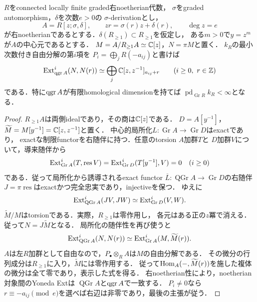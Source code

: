 \documentclass[11pt,a4paper]{ltjsarticle}
\begin{document}
\begin{lemma}[中心的な局所化を持つOre拡大の頂点]
\label{lem:v6-ore-differential-vertex}
$R$をconnected locally finite graded右noetherian代数，
$\sigma$をgraded automorphism，$\delta$を次数$e>0$の
$\sigma$-derivationとし，
\[
 A=R[z;\sigma,\delta],\qquad zr=\sigma(r)z+\delta(r),
 \qquad \deg z=e
\]
が右noetherianであるとする．$\delta(R_{\geq1})\subset R_{\geq1}$を仮定し，
ある$m>0$で$y=z^m$が$A$の中心元であるとする．
$M=A/R_{\geq1}A\simeq\mathbb C[z]$，$N=\pi M$と置く．
$k_R$の最小次数付き自由分解の第$i$項を
$P_i=\bigoplus_j R(-a_{ij})$と書けば
\[
 \operatorname{Ext}^i_{\operatorname{qgr} A}(N,N(r))
 \simeq\bigoplus_j\mathbb C[z,z^{-1}]_{a_{ij}+r}
 \qquad(i\geq0,\ r\in\mathbb Z)
\]
である．特に$\operatorname{qgr} A$が有限homological dimensionを持てば
$\operatorname{pd}_{\operatorname{Gr}R}k_R<\infty$となる．
\end{lemma}
\begin{proof}
$R_{\geq1}A$は両側idealであり，その商は$\mathbb C[z]$である．
$D=A[y^{-1}]$，$\widetilde M=M[y^{-1}]=\mathbb C[z,z^{-1}]$と置く．
中心的局所化$L:\operatorname{Gr}A\to\operatorname{Gr}D$はexactであり，
exactな制限functorを右随伴に持つ．任意のtorsion $A$加群$T$と
$D$加群$V$について，導来随伴から
\[
 \operatorname{Ext}^i_{\operatorname{Gr}A}(T,\operatorname{res}V)
 =\operatorname{Ext}^i_{\operatorname{Gr}D}(T[y^{-1}],V)=0
 \quad(i\geq0)
\]
である．従って局所化から誘導されるexact functor
$\overline L:\operatorname{QGr}A\to\operatorname{Gr}D$の右随伴
$J=\pi\operatorname{res}$はexactかつ完全忠実であり，injectiveを保つ．
ゆえに
\[
 \operatorname{Ext}^i_{\operatorname{QGr}A}(JV,JW)
 \simeq\operatorname{Ext}^i_{\operatorname{Gr}D}(V,W).
\]
$\widetilde M/M$はtorsionである．実際，$R_{\geq1}$は零作用し，
各元はある正の$z$冪で消える．従って$N=J\widetilde M$となる．
局所化の随伴性を再び使うと
\[
 \operatorname{Ext}^i_{\operatorname{QGr}A}(N,N(r))
 \simeq\operatorname{Ext}^i_{\operatorname{Gr}A}(M,\widetilde M(r)).
\]
$A$は左$R$加群として自由なので，$P_\bullet\otimes_R A$は$M$の自由分解である．
その微分の行列成分は$R_{\geq1}$に入り，$\widetilde M$には零作用する．
従って$\operatorname{Hom}_A(-,\widetilde M(r))$を施した複体の微分は全て零であり，表示した式を得る．
右noetherian性により，noetherian対象間のYoneda Extは
$\operatorname{QGr}A$と$\operatorname{qgr} A$で一致する．
$P_i\ne0$なら$r\equiv-a_{ij}\pmod e$を選べば右辺は非零であり，最後の主張が従う．
\end{proof}
\end{document}
